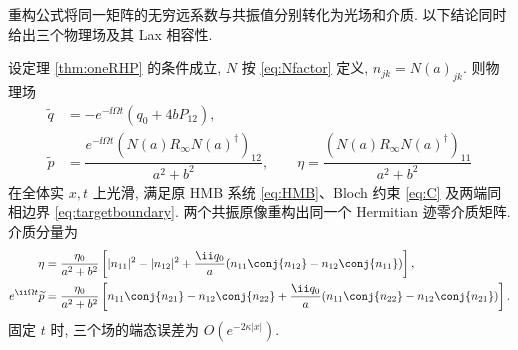 重构公式将同一矩阵的无穷远系数与共振值分别转化为光场和介质. 以下结论同时给出三个物理场及其 Lax 相容性.

\begin{theorem}[单轨道三场解]\label{thm:direct-HMB}\label{prop:oneboundary}
设定理 \ref{thm:oneRHP} 的条件成立, $N$ 按 \eqref{eq:Nfactor} 定义, $n_{jk}=N(a)_{jk}$. 则物理场
\begin{equation}\label{eq:finalfields}
\begin{aligned}
\widetilde q&=-e^{-\ii\Omega t}(q_0+4bP_{12}),\\
\widetilde p&=\dfrac{e^{-\ii\Omega t}(N(a)R_\infty N(a)^\dagger)_{12}}{a^2+b^2},\qquad
\eta=\dfrac{(N(a)R_\infty N(a)^\dagger)_{11}}{a^2+b^2}
\end{aligned}
\end{equation}
在全体实 $x,t$ 上光滑, 满足原 HMB 系统 \eqref{eq:HMB}、Bloch 约束 \eqref{eq:C} 及两端同相边界 \eqref{eq:targetboundary}. 两个共振原像重构出同一个 Hermitian 迹零介质矩阵. 介质分量为
\begin{align}
\eta&=\dfrac{\eta_0}{a^2+b^2}\left[|n_{11}|^2-|n_{12}|^2
+\dfrac{\ii q_0}{a}(n_{11}\conj{n_{12}}-n_{12}\conj{n_{11}})\right],\label{eq:etacomponent}\\
e^{\ii\Omega t}\widetilde p&=\dfrac{\eta_0}{a^2+b^2}\left[n_{11}\conj{n_{21}}-n_{12}\conj{n_{22}}
+\dfrac{\ii q_0}{a}(n_{11}\conj{n_{22}}-n_{12}\conj{n_{21}})\right].\label{eq:pcomponent}
\end{align}
固定 $t$ 时, 三个场的端态误差为 $O(e^{-2\kappa|x|})$.
\end{theorem}
